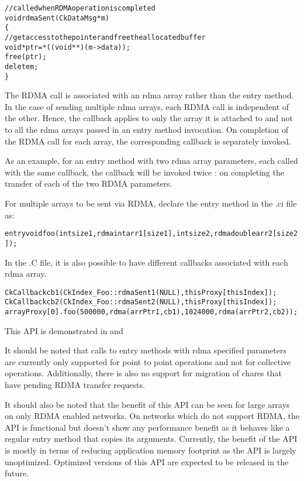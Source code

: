 \begin{alltt}
//called when RDMA operation is completed
void rdmaSent(CkDataMsg *m)
\{
  //get access to the pointer and free the allocated buffer
  void *ptr = *((void **)(m->data));
  free(ptr);
  delete m;
\}
\end{alltt}

The RDMA call is associated with an rdma array rather than the entry method.
In the case of sending multiple rdma arrays, each RDMA call is independent of the other.
Hence, the callback applies to only the array it is attached to and not to all the rdma
arrays passed in an entry method invocation. On completion of the RDMA call for each
array, the corresponding callback is separately invoked.

As an example, for an entry method with two rdma array parameters, each called with the same
callback, the callback will be invoked twice : on completing the transfer of each of the two
RDMA parameters.

\vspace{0.1in}
\noindent
For multiple arrays to be sent via RDMA, declare the entry method in the .ci file as:

\begin{alltt}
entry void foo (int size1, rdma int arr1[size1], int size2, rdma double arr2[size2]);
\end{alltt}

In the .C file, it is also possible to have different callbacks associated with each rdma array.
\begin{alltt}
CkCallback cb1(CkIndex_Foo::rdmaSent1(NULL), thisProxy[thisIndex]);
CkCallback cb2(CkIndex_Foo::rdmaSent2(NULL), thisProxy[thisIndex]);
arrayProxy[0].foo(500000, rdma(arrPtr1, cb1), 1024000, rdma(arrPtr2, cb2));
\end{alltt}

This API is demonstrated in  and 

\vspace{0.1in}
\noindent
It should be noted that calls to entry methods with rdma specified parameters are
currently only supported for point to point operations and not for collective operations.
Additionally, there is also no support for migration of chares that have pending RDMA transfer
requests.

\vspace{0.1in}
\noindent
It should also be noted that the benefit of this API can be seen for large arrays on
only RDMA enabled networks. On networks which do not support RDMA, the API is functional
but doesn't show any performance benefit as it behaves like a regular entry method that
copies its arguments. Currently, the benefit of the API is mostly in terms of reducing
application memory footprint as the API is largely unoptimized. Optimized versions of this
API are expected to be released in the future.
